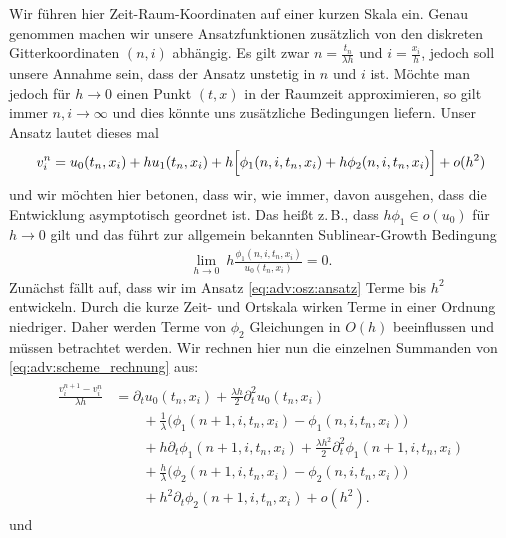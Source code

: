 Wir führen hier Zeit-Raum-Koordinaten auf einer kurzen Skala ein.
Genau genommen machen wir unsere Ansatzfunktionen zusätzlich von den diskreten Gitterkoordinaten $(n,i)$ abhängig.
Es gilt zwar $n = \frac {t_n} {\lambda h}$ und $i = \frac {x_i}{h}$, jedoch soll unsere Annahme sein, dass der Ansatz unstetig in $n$ und $i$ ist.
Möchte man jedoch für $h \to 0$ einen Punkt $(t,x)$ in der Raumzeit approximieren, so gilt immer $n,i \to \infty$ und dies könnte uns zusätzliche Bedingungen liefern.
Unser Ansatz lautet dieses mal
\begin{align}\label{eq:adv:osz:ansatz}
v^n_i = u_0(t_n, x_i) + h u_1(t_n, x_i) + h \Bigl[ \phi_1(n, i, t_n, x_i) + h \phi_2(n, i, t_n, x_i) \Bigr] + o(h^2)
\end{align}
und wir möchten hier betonen, dass wir, wie immer, davon ausgehen, dass die Entwicklung asymptotisch geordnet ist.
Das heißt z.\,B., dass $h \phi_1 \in o(u_0)$ für $h \to 0$ gilt und das führt zur allgemein bekannten Sublinear-Growth Bedingung
\begin{align}\label{eq:osz:sublineargrowth}
\lim_{h \to 0} \: h \frac{\phi_1(n, i, t_n, x_i)}{u_0(t_n, x_i)} = 0.
\end{align}
Zunächst fällt auf, dass wir im Ansatz \eqref{eq:adv:osz:ansatz} Terme bis $h^2$ entwickeln.
Durch die kurze Zeit- und Ortskala wirken Terme in einer Ordnung niedriger.
Daher werden Terme von $\phi_2$ Gleichungen in $O(h)$ beeinflussen und müssen betrachtet werden.
Wir rechnen hier nun die einzelnen Summanden von \eqref{eq:adv:scheme_rechnung} aus:
{\small
\begin{align} \label{eq:adv:osz:diff1}
\begin{split}
\frac {v^{n+1}_i - v^n_i} {\lambda h}
&= \partial_t u_0(t_n, x_i) + \frac {\lambda h}{2} \partial^2_t u_0(t_n, x_i)\\
&\qquad + \frac 1 \lambda \bigl( \phi_1(n+1, i, t_n, x_i) - \phi_1(n, i, t_n, x_i) \bigr)\\
&\qquad + h \partial_t \phi_1(n+1, i, t_n, x_i) + \frac {\lambda h^2}{2} \partial^2_t \phi_1(n+1, i, t_n, x_i)\\
&\qquad + \frac h \lambda \bigl( \phi_2(n+1, i, t_n, x_i) - \phi_2(n, i, t_n, x_i) \bigr)\\
&\qquad + h^2 \partial_t \phi_2(n+1, i, t_n, x_i) + o(h^2).
\end{split}
\end{align}
} und
